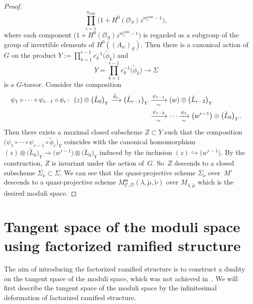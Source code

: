 \documentclass[pdftex]{sigma}
\numberwithin{equation}{section}
\newcommand{\balpha}{\boldsymbol \alpha}
\begin{document}
\begin{proof}
\[ \prod_{i=1}^{n_{\mathrm{ram}}}\big(1+H^0({\mathcal O}_S)z^{m^{\mathrm{ram}}_i-1}\big),
\]
where each component
$\big(1+H^0({\mathcal O}_S)z^{m^{\mathrm{ram}}_i-1}\big)$
is regarded as a subgroup of the group of invertible elements of
$H^0((A_w)_S)$.
Then there is a canonical action of $G$ on the product
$Y:=\prod_{k=1}^{r-1}c_k^{-1}\big(\tilde{\phi}_k\big)$
and
\[
 Y=\prod_{k=1}^{r-1}c_k^{-1}\big(\tilde{\phi}_k\big) \longrightarrow \Sigma
\]
is a $G$-torsor.
Consider the composition
\begin{gather*}
\begin{split}
 & \psi_1\circ\cdots\circ\psi_{r-1}\circ\phi_r
 \colon \
 (z)\otimes \big(\tilde{L}_0\big)_Y\xrightarrow{\tilde{\phi}_r}
 \big(\tilde{L}_{r-1}\big)_Y\xrightarrow[\sim]{\psi_{r-1}}
 (w)\otimes \big(\tilde{L}_{r-2}\big)_Y
\\
& \hphantom{\psi_1\circ\cdots\circ\psi_{r-1}\circ\phi_r
 \colon \
 (z)\otimes \big(\tilde{L}_0\big)_Y\xrightarrow{\tilde{\phi}_r}
 \big(\tilde{L}_{r-1}\big)_Y}{}
 \xrightarrow[\sim]{\psi_{r-2}}\cdots \xrightarrow[\sim]{\psi_1}
 \big(w^{r-1}\big)\otimes \big(\tilde{L}_0\big)_Y.
 \end{split}
\end{gather*}
Then there exists a maximal closed subscheme
$Z\subset Y$ such that
the composition
$\big(\psi_1\circ\cdots\circ\psi_{r-1}\circ\tilde{\phi}_r\big)_Y$
coincides with the canonical homomorphism
$(z)\otimes\big(\tilde{L}_0\big)_Y\longrightarrow \big(w^{r-1}\big)\otimes \big(\tilde{L}_0\big)_Y$
induced by the inclusion $(z)\hookrightarrow \big(w^{r-1}\big)$.
By the construction, $Z$ is invariant under the action of~$G$.
So~$Z$ descends to a closed subscheme
$\Sigma_{\tilde{\nu}}\subset\Sigma$.
We can see that the quasi-projective scheme $\Sigma_{\tilde{\nu}}$
over~$M'$ descends to a quasi-projective scheme
$M^{\balpha}_{{\mathcal C},{\mathcal D}}(\lambda,\tilde{\mu},\tilde{\nu})$
over $M_{\lambda,\tilde{\mu}}$
which is the desired moduli space.
\end{proof}

\section[Tangent space of the moduli space using factorized ramified structure]{Tangent space of the moduli space\\ using factorized ramified structure}
\label{section: tangent space}

The aim of introducing the factorized ramified structure is to
construct a duality on the tangent space of the moduli space,
which was not achieved in~\cite{Inaba-2}.
We will first describe the tangent space of the moduli space
by the infinitesimal deformation of factorized ramified structure.
\end{document}
